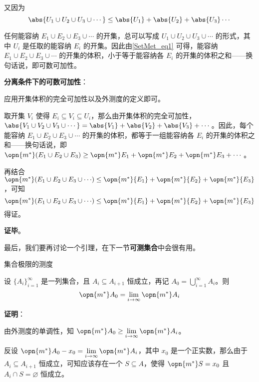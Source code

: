又因为
\begin{equation}\label{SetMet_eq1}
\abs{U_1\cup U_2\cup U_3\cup \cdots} \leq \abs{U_1}+\abs{U_2}+\abs{U_3}\cdots
\end{equation}

任何能容纳 $E_1\cup E_2\cup E_3\cup \cdots $ 的开集，总可以写成 $U_1\cup U_2\cup U_3\cup \cdots$ 的形式，其中 $U_i$ 是任取的能容纳 $E_i$ 的开集。因此由\autoref{SetMet_eq1} 可得，能容纳 $E_1\cup E_2\cup E_3\cup \cdots $ 的开集的体积，小于等于能容纳各 $E_i$ 的开集的体积之和——换句话说，即可数可加性。

\textbf{分离条件下的可数可加性}：

应用开集体积的完全可加性以及外测度的定义即可。

取开集 $V_i$ 使得 $E_i\subseteq V_i\subseteq U_i$，那么由开集体积的完全可加性，$\abs{V_1\cup V_2\cup V_3\cup \cdots}=\abs{V_1}+\abs{V_2}+\abs{V_3}+\cdots$。因此，每个能容纳 $E_1\cup E_2\cup E_3\cup\cdots$ 的开集的体积，都等于一组能容纳各 $E_i$ 的开集的体积之和——换句话说，即 $\opn{m^*}(E_1\cup E_2\cup E_3)\geq\opn{m^*}E_1+\opn{m^*}E_2+\opn{m^*}E_3+\cdots$。

再结合 $\opn{m^*}({E_1\cup E_2\cup E_3\cup \cdots})\leq \opn{m^*}{E_1}+\opn{m^*}{E_2}+\opn{m^*}{E_3}$，可知
\begin{equation}
\opn{m^*}({E_1\cup E_2\cup E_3\cup \cdots})\leq \opn{m^*}{E_1}+\opn{m^*}{E_2}+\opn{m^*}{E_3}
\end{equation}
得证。

\textbf{证毕}。

最后，我们要再讨论一个引理，在下一节\textbf{可测集合}中会很有用。

\begin{lemma}{集合极限的测度}\label{SetMet_lem1}

设 $\{A_i\}_{i=1}^\infty$ 是一列集合，且 $A_{i}\subseteq A_{i+1}$ 恒成立，再记 $A_0=\bigcup_{i=1}^\infty A_i$。则
\begin{equation}
\opn{m^*}A_0=\lim\limits_{i\to\infty}\opn{m^*}A_i
\end{equation}

\end{lemma}


\textbf{证明}：

由外测度的单调性，知 $\opn{m^*}A_0\geq\lim\limits_{i\to\infty}\opn{m^*}A_i$。

反设 $\opn{m^*}A_0-x_0=\lim\limits_{i\to\infty}\opn{m^*}A_i$，其中 $x_0$ 是一个正实数，那么由于 $A_{i}\subseteq A_{i+1}$ 恒成立，可知应该存在一个 $S\subseteq A$，使得 $\opn{m^*}S=x_0$ 且 $A_i\cap S=\varnothing$ 恒成立。

